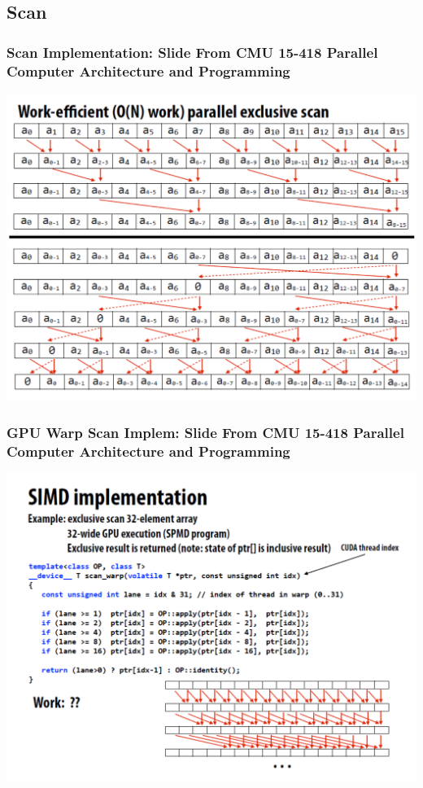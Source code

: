 \documentclass{beamer}
\begin{document}
\subsection{Scan}

\begin{frame}[fragile]
	\tableofcontents[currentsubsection]
\end{frame}


\begin{frame}[fragile,t]
\frametitle{{\tiny Scan Implementation: Slide From CMU 15-418 Parallel Computer Architecture and Programming}}

\includegraphics[width=55ex]{Figures/ExcScanNew}

\end{frame}

\begin{frame}[fragile,t]
\frametitle{{\tiny GPU Warp Scan Implem: Slide From CMU 15-418 Parallel Computer Architecture and Programming}}

\includegraphics[width=55ex]{Figures/ExcScanGPU}

\end{frame}
\end{document}
